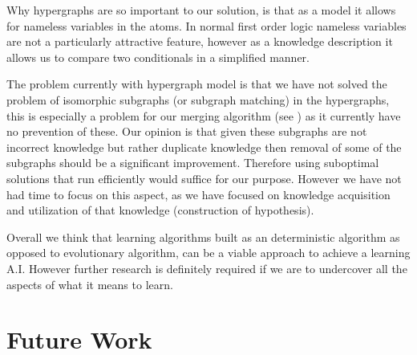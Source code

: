 \documentclass[Master.tex]{subfiles}
\begin{document}
	Why hypergraphs are so important to our solution, is that as a model it allows for nameless variables in the atoms. 
	In normal first order logic nameless variables are not a particularly attractive feature, 
	however as a knowledge description it allows us to compare two conditionals in a simplified manner.
	
	The problem currently with hypergraph model is that we have not solved the problem of isomorphic subgraphs (or subgraph matching) in the hypergraphs, 
	this is especially a problem for our merging algorithm (see ) as it currently have no prevention of these.
	Our opinion is that given these subgraphs are not incorrect knowledge but rather duplicate knowledge then removal of some of the subgraphs should be a significant improvement.
	Therefore using suboptimal solutions that run efficiently would suffice for our purpose. 
	However we have not had time to focus on this aspect, as we have focused on knowledge acquisition and utilization of that knowledge (construction of hypothesis).
	
	
	Overall we think that learning algorithms built as an deterministic algorithm as opposed to evolutionary algorithm, can be a viable approach to achieve a learning A.I. However further research is definitely required if we are to undercover all the aspects of what it means to learn.
	
	
	
	
	
	

	\section{Future Work}
	
	
	
\end{document}
